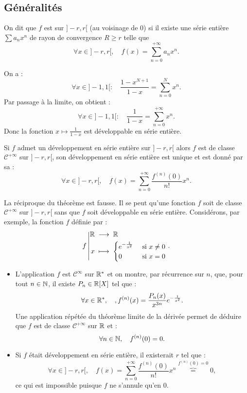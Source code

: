 \documentclass{book}
\begin{document}
\subsection{Généralités}
\begin{Definition}
On dit que $f$ est  sur $]-r,r[$ (au voisinage de $0$)
si il existe une série entière $\sum a_n x^n $ de rayon de convergence $R\geq r $ telle que
\[ \forall x\in ]-r ,r [,\quad f(x) = \sum_{n=0}^{+\infty} a_n x^n. \]
\end{Definition}
\begin{Exemple}
On a :
$$ \forall x\in ]-1,1[:\quad  \frac{1-x^{N+1}}{1-x}=\sum_{n=0}^N x^n.$$
Par passage à la limite, on obtient :
$$ \forall x\in ]-1,1[:\quad  \frac{1}{1-x}=\sum_{n=0}^{+\infty}x^n.$$
Donc la fonction $x\mapsto  \frac{1}{1-x}$  est développable en série entière.
\end{Exemple}
\begin{Theoreme}
Si $f$ admet un développement en série entière sur $]-r, r [$ alors $f$ est de classe $\mathcal{C}^{+\infty}$ sur $]-r, r [$, son
développement en série entière est unique et est donné par sa  :
$$\forall x\in ]-r ,r [,\quad f(x) = \sum_{n=0}^{+\infty} \frac{f^{(n)}(0)}{n!} x^n. $$ 
\end{Theoreme}
\begin{Remarque}
La réciproque du théorème est fausse.
Il se peut qu'une fonction $f$ soit de classe $\mathcal{C}^{+\infty}$ sur $]-r, r [$ sans que $f$ soit  développable en série entière. Considérons, par exemple, la fonction $f$ définie par :
$${f}\left|\begin{aligned}{\mathbb{R}}&\;\longrightarrow\;{\mathbb{R}}\\{x}&\;\longmapsto\;{\begin{cases}e^{-\frac{1}{x^2}}&\text{ si }x\neq 0\\ 0 &\text{ si }x= 0 \end{cases} }\end{aligned}\right..$$
\begin{itemize}
\item L'application $f$ est  $\mathcal{C}^{\infty}$ sur $\mathbb{R}^*$ et on montre, par récurrence sur $n$, que, pour tout $n\in \mathbb{N}$, il existe $P_n\in \mathbb{R}[X]$ tel que :
$$\forall x\in \mathbb{R}^*,\quad, f^{(n)}(x)=\frac{P_n(x)}{x^{3n}}  e^{-\frac{1}{x^2}}.$$ 
Une application répétée du théorème limite de la dérivée permet de déduire que  $f$ est de classe $\mathcal{C}^{+\infty}$ sur $\mathbb{R}$ et :
$$ \forall n\in \mathbb{N},\quad f^{(n)}(0)=0.$$
\item Si $f$ était développement en série entière, il existerait $r$ tel que :
$$\forall x \in ]-r,r[,\quad f(x) = \sum_{n=0}^{+\infty} \frac{f^{(n)}(0)}{n!} x^n\overbrace{=}^{f^{(n)}(0)=0}0,$$
ce qui est impossible puisque $f$ ne s'annule qu'en 0.
\end{itemize}

\end{Remarque}
\end{document}
